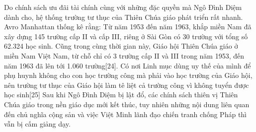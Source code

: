 \documentclass[../thesis.tex]{subfiles}
\begin{document}
Do chính sách ưu đãi tài chính cùng với những đặc quyền mà Ngô Đình Diệm dành cho, hệ thống trường tư thục của Thiên Chúa giáo phát triển rất nhanh. Avro Manhattan thống kê rằng: Từ năm 1953 đến năm 1963, khắp miền Nam đã xây dựng 145 trường cấp II và cấp III, riêng ở Sài Gòn có 30 trường với tổng số 62.324 học sinh. Cũng trong cùng thời gian này, Giáo hội Thiên Chúa giáo ở miền Nam Việt Nam, từ chỗ chỉ có 3 trường cấp II và III trong năm 1953, đến năm 1963 đã lên tới 1.060 trường[24]. Có nơi Linh mục dùng uy thế của mình để phụ huynh không cho con học trường công mà phải vào học trường của Giáo hội, nên trường tư thục của Giáo hội làm tê liệt cả trường công vì không tuyển được học sinh[25]
Sau khi Ngô Đình Diệm bị lật đổ, các chính sách thiên vị Thiên Chúa giáo trong nền giáo dục mới kết thúc, tuy nhiên những nội dung liên quan đến chủ nghĩa cộng sản và việc Việt Minh lãnh đạo chiến tranh chống Pháp thì vẫn bị cấm giảng dạy.
\end{document}
